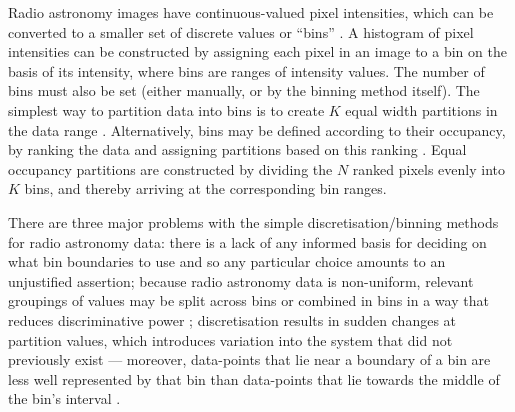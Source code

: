 \documentclass[
    ,final            %
  ]
  {aipproc}
\begin{document}
Radio astronomy images have continuous-valued pixel intensities, which can be converted to a smaller set of discrete values or ``bins'' \cite{yang2010discretization}.
A histogram of pixel intensities can be constructed by assigning each pixel in an image to a bin on the basis of its intensity, where bins are ranges of intensity values. %
%
The number of bins must also be set (either manually, or by the binning method itself). %
The simplest way to partition data into bins is to create $K$ equal width partitions in the data range \cite{yang2010discretization}.
Alternatively, bins may be defined according to their occupancy, by
ranking the data and assigning partitions based on this ranking
\cite{yang2010discretization}.  Equal occupancy partitions are
constructed by dividing the $N$ ranked pixels evenly into $K$ bins, and
thereby arriving at the corresponding bin ranges.


There are three major problems with the simple discretisation/binning methods for radio astronomy data: there is a lack of any informed basis for deciding on what bin boundaries to use and so any particular choice amounts to an unjustified assertion; because radio astronomy data is non-uniform, relevant groupings of values may be split across bins or combined in bins in a way that reduces discriminative power \cite{clarke2000entropy}; discretisation results in sudden changes at partition values, which introduces variation into the system that did not previously exist --- moreover, data-points that lie near a boundary of a bin are less well represented by that bin than data-points that lie towards the middle of the bin's interval \cite{yang2002non}.
\end{document}
